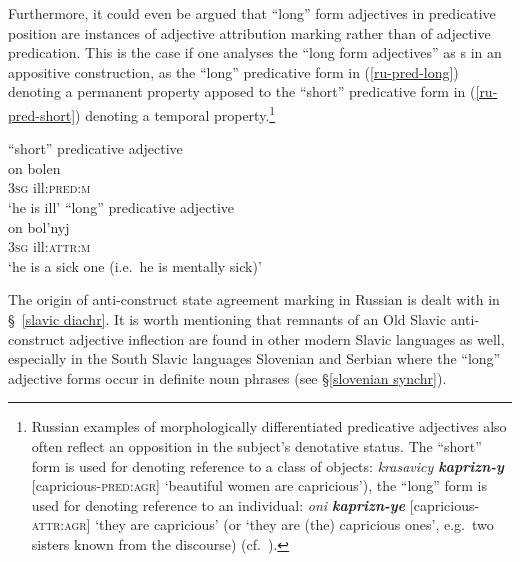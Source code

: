 Furthermore, it could even be argued that “long” form adjectives in predicative position are instances of adjective attribution marking rather than of adjective predication. This is the case if one analyses the “long form adjectives” as s in an appositive construction, as the “long” predicative form in (\ref{ru-pred-long}) denoting a permanent property apposed to the “short” predicative form in (\ref{ru-pred-short}) denoting a temporal property.\footnote{Russian examples of morphologically differentiated predicative adjectives also often reflect an opposition in the subject's denotative status. The “short” form is used for denoting reference to a class of objects: \textit{krasavicy \textbf{kaprizn-y}} [capricious-\textsc{pred:agr}] ‘beautiful women are capricious’), the “long” form is used for denoting reference to an individual: \textit{oni \textbf{kaprizn-ye}} [capricious-\textsc{attr:agr}] ‘they are capricious’ (or ‘they are (the) capricious ones’, e.g.~two sisters known from the discourse) (cf.~\citealt[210 Footnote 76]{mendoza2004}).}
\begin{exe}
\ex
{}
\begin{xlist}
\ex \rm{“short” predicative adjective}\\
\gll on bolen\\
	3\textsc{sg} ill:\textsc{pred:m}\\
\glt	 ‘he is ill’\label{ru-pred-short}
\ex \rm{“long” predicative adjective}\\
\gll on bol'nyj\\
	3\textsc{sg} ill:\textsc{attr:m}\\
\glt	 ‘he is a sick one (i.e.~he is mentally sick)’\label{ru-pred-long}
\end{xlist}
\end{exe}
The origin of anti\hyp{}construct state agreement marking in Russian is dealt with in \S~\ref{slavic diachr}. It is worth mentioning that remnants of an Old Slavic anti\hyp{}construct adjective inflection are found in other modern Slavic languages as well, especially in the South Slavic languages Slovenian and Serbian where the “long” adjective forms occur in definite noun phrases (see \S \ref{slovenian synchr}).

